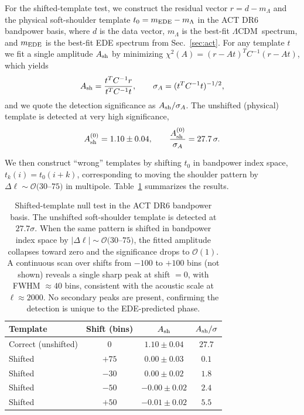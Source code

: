 \documentclass[twocolumn,showpacs,preprintnumbers,amsmath,amssymb,prd]{revtex4-2}
\newcommand{\lcdm}{$\Lambda$CDM}
\begin{document}
For the shifted-template test, we construct the residual vector
$r = d - m_\Lambda$ and the physical soft-shoulder template
$t_0 = m_{\rm EDE} - m_\Lambda$ in the ACT DR6 bandpower basis, where
$d$ is the data vector, $m_\Lambda$ is the best-fit \lcdm\ spectrum, and
$m_{\rm EDE}$ is the best-fit EDE spectrum from Sec.~\ref{sec:act}.
For any template $t$ we fit a single amplitude $A_{\rm sh}$ by minimizing
$\chi^2(A) = (r - A t)^T C^{-1} (r - A t)$, which yields
\begin{equation}
  A_{\rm sh} = \frac{t^T C^{-1} r}{t^T C^{-1} t}, \qquad
  \sigma_{A} = (t^T C^{-1} t)^{-1/2},
\end{equation}
and we quote the detection significance as $A_{\rm sh}/\sigma_{A}$.
The unshifted (physical) template is detected at very high significance,
\begin{equation}
  A_{\rm sh}^{(0)} = 1.10 \pm 0.04, \qquad
  \frac{A_{\rm sh}^{(0)}}{\sigma_{A}} = 27.7\,\sigma.
\end{equation}

We then construct ``wrong'' templates by shifting $t_0$ in bandpower index
space, $t_k(i) = t_0(i + k)$, corresponding to moving the shoulder pattern
by $\Delta\ell \sim \mathcal{O}(30$--$75)$ in multipole. Table~\ref{tab:shifted}
summarizes the results.

\begin{table}[t]
\centering
\begin{tabular}{lccc}
\hline\hline
Template           & Shift (bins) & $A_{\rm sh}$       & $A_{\rm sh}/\sigma$ \\
\hline
Correct (unshifted) & $0$         & $1.10 \pm 0.04$    & $27.7$ \\
Shifted             & $+75$       & $0.00 \pm 0.03$    & $0.1$ \\
Shifted             & $-30$       & $0.00 \pm 0.02$    & $1.8$ \\
Shifted             & $-50$       & $-0.00 \pm 0.02$   & $2.4$ \\
Shifted             & $+50$       & $-0.01 \pm 0.02$   & $5.5$ \\
\hline\hline
\end{tabular}
\caption{Shifted-template null test in the ACT DR6 bandpower basis. The
unshifted soft-shoulder template is detected at $27.7\sigma$. When the
same pattern is shifted in bandpower index space by $|\Delta\ell| \sim
\mathcal{O}(30$--$75)$, the fitted amplitude collapses toward zero and
the significance drops to $\mathcal{O}(1)$. A continuous scan over shifts 
from $-100$ to $+100$ bins (not shown) reveals a single sharp peak at 
shift $= 0$, with FWHM $\approx 40$ bins, consistent with the acoustic 
scale at $\ell \approx 2000$. No secondary peaks are present, confirming 
the detection is unique to the EDE-predicted phase.}
\label{tab:shifted}
\end{table}
\end{document}
